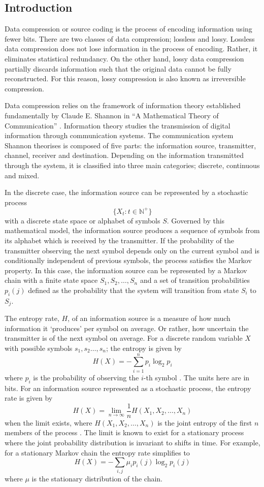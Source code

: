 \subsection{Introduction}

Data compression or source coding is the process of encoding information using fewer bits. There are two classes of data compression; lossless and lossy. Lossless data compression does not lose information in the process of encoding. Rather, it eliminates statistical redundancy. On the other hand, lossy data compression partially discards information such that the original data cannot be fully reconstructed. For this reason, lossy compression is also known as irreversible compression.

Data compression relies on the framework of information theory established fundamentally by Claude E. Shannon in ``A Mathematical Theory of Communication'' \cite{shannon}. Information theory studies the transmission of digital information through communication systems. The communication system Shannon theorises is composed of five parts: the information source, transmitter, channel, receiver and destination. Depending on the information transmitted through the system, it is classified into three main categories; discrete, continuous and mixed.


In the discrete case, the information source can be represented by a stochastic process \[\{X_t: t\in\mathbb{N}^+\}\] with a discrete state space or alphabet of symbols $S$. Governed by this mathematical model, the information source produces a sequence of symbols from its alphabet which is received by the transmitter. If the probability of the transmitter observing the next symbol depends only on the current symbol and is conditionally independent of previous symbols, the process satisfies the Markov property. In this case, the information source can be represented by a Markov chain with a finite state space $S_1,S_2,\dots,S_n$ and a set of transition probabilities $p_i(j)$ defined as the probability that the system will transition from state $S_i$ to $S_j$.

The entropy rate, $H$, of an information source is a measure of how much information it `produces' per symbol on average. Or rather, how uncertain the transmitter is of the next symbol on average. For a discrete random variable $X$ with possible symbols $s_1,s_2\dots,s_n$; the entropy is given by \[H(X)=-\sum_{i=1}^np_i\log_2p_i\] where $p_i$ is the probability of observing the $i$-th symbol \cite{shannon}. The units here are in bits. For an information source represented as a stochastic process, the entropy rate is given by \[H(X)=\lim_{n\to\infty}\frac{1}{n}H(X_1,X_2,\dots,X_n)\] when the limit exists, where $H(X_1,X_2,\dots,X_n)$ is the joint entropy of the first $n$ members of the process \cite{info-book}. The limit is known to exist for a stationary process where the joint probability distribution is invariant to shifts in time. For example, for a stationary Markov chain the entropy rate simplifies to \[H(X)=-\sum_{i,j}\mu_ip_i(j)\log_2p_i(j)\] where $\mu$ is the stationary distribution of the chain.

